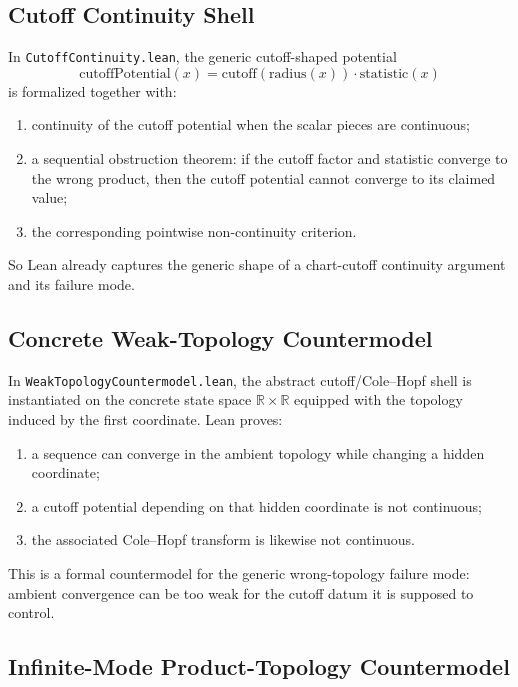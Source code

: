 \documentclass[11pt]{article}
\begin{document}
\subsection{Cutoff Continuity Shell}

In \texttt{CutoffContinuity.lean}, the generic cutoff-shaped potential
\[
\mathrm{cutoffPotential}(x) = \mathrm{cutoff}(\mathrm{radius}(x))
\cdot \mathrm{statistic}(x)
\]
is formalized together with:
\begin{enumerate}[leftmargin=1.5em]
  \item continuity of the cutoff potential when the scalar pieces are
  continuous;
  \item a sequential obstruction theorem: if the cutoff factor and statistic
  converge to the wrong product, then the cutoff potential cannot converge to
  its claimed value;
  \item the corresponding pointwise non-continuity criterion.
\end{enumerate}

So Lean already captures the generic shape of a chart-cutoff continuity
argument and its failure mode.

\subsection{Concrete Weak-Topology Countermodel}

In \texttt{WeakTopologyCountermodel.lean}, the abstract cutoff/Cole--Hopf shell
is instantiated on the concrete state space \(\mathbb{R}\times\mathbb{R}\)
equipped with the topology induced by the first coordinate.  Lean proves:
\begin{enumerate}[leftmargin=1.5em]
  \item a sequence can converge in the ambient topology while changing a hidden
  coordinate;
  \item a cutoff potential depending on that hidden coordinate is not
  continuous;
  \item the associated Cole--Hopf transform is likewise not continuous.
\end{enumerate}

This is a formal countermodel for the generic wrong-topology failure mode:
ambient convergence can be too weak for the cutoff datum it is supposed to
control.

\subsection{Infinite-Mode Product-Topology Countermodel}
\end{document}
